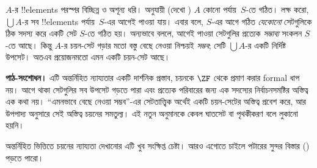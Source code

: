 \documentclass[../../../include/open-logic-section]{subfiles}
\begin{document}
$A$-র !!{element}s পরস্পর বিচ্ছিন্ন ও অশূন্য
ধরি। \stageshier{} অনুযায়ী (দেখো
) $A$ কোনো পর্যায়~$S$-তে
গঠিত। লক্ষ করো, $\bigcup A$-র সব !!{element}s
পর্যায়~$S$-এর আগেই পাওয়া যায়। এবার
\stagesacc{} বলে, $S$-এর আগে গঠিত
\emph{যেকোনো} সেটগুলিকে ঠিক সদস্য করে
একটি সেট $S$-তে গঠিত হয়। অন্যভাবে বললে,
আগেই পাওয়া সেটগুলির প্রত্যেক \emph{সম্ভাব্য}
সংকলন $S$-তে আছে। কিন্তু $A$-র চয়ন-সেট
গড়ার মতো বস্তু বেছে নেওয়া নিশ্চয়ই
\emph{সম্ভব}; সেটি $\bigcup A$-র একটি
নির্দিষ্ট উপসেট। অতএব প্রয়োজনমতো এমন
একটি চয়ন-সেট আছে।
\par\noindent\textbf{পাঠ-সংশোধন।} এটি অন্তর্নিহিত ন্যায্যতার একটি দার্শনিক প্রস্তাব, চয়নকে
$\ZF$ থেকে প্রমাণ করার formal ধাপ নয়। আগে থাকা সেটগুলির
সব উপসেট গড়তে পারা এবং প্রত্যেক পরিবারের জন্য এক সদস্যের
নির্বাচনসমষ্টির অস্তিত্ব এক কথা নয়। ``এমনভাবে বেছে নেওয়া
সম্ভব''-এর সেটতাত্ত্বিক অর্থেই একটি চয়ন-সেটের অস্তিত্ব
প্রবেশ করে, আর উপপাদ্য অনুসারে সেই অস্তিত্ব চয়নের সমতুল্য।
এই নতুন অনুমানকে কেবল ঘাতসেট বা পৃথকীকরণ বলে লুকানো হয়নি।

অন্তর্নিহিত ভিত্তিতে চয়নের ন্যায্যতা দেখানোর
এটি খুব সংক্ষিপ্ত চেষ্টা। আরও এগোতে চাইলে
পটারের সুন্দর বিস্তার
(\citeyear[\S14.8]{Potter2004}) পড়তে পারো।
\end{document}
